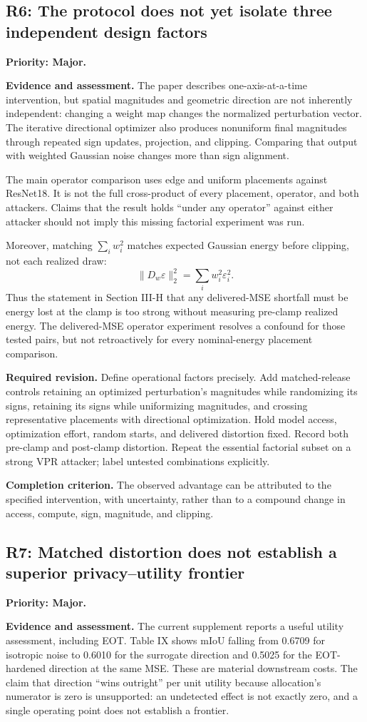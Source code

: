 \documentclass[11pt,a4paper]{article}
\newcommand{\finding}[3]{\subsection{#1: #3}\label{rev:#1}\textbf{Priority: #2.}}
\newcommand{\evidence}{\par\textbf{Evidence and assessment.} }
\newcommand{\action}{\par\textbf{Required revision.} }
\newcommand{\acceptance}{\par\textbf{Completion criterion.} }
\begin{document}
\finding{R6}{Major}{The protocol does not yet isolate three independent design factors}
\evidence
The paper describes one-axis-at-a-time intervention, but spatial magnitudes and geometric direction are not inherently independent: changing a weight map changes the normalized perturbation vector. The iterative directional optimizer also produces nonuniform final magnitudes through repeated sign updates, projection, and clipping. Comparing that output with weighted Gaussian noise changes more than sign alignment.

The main operator comparison uses edge and uniform placements against ResNet18. It is not the full cross-product of every placement, operator, and both attackers. Claims that the result holds ``under any operator'' against either attacker should not imply this missing factorial experiment was run.

Moreover, matching $\sum_iw_i^2$ matches expected Gaussian energy before clipping, not each realized draw:
\begin{equation}
\|D_w\varepsilon\|_2^2=\sum_iw_i^2\varepsilon_i^2.
\end{equation}
Thus the statement in Section III-H that any delivered-MSE shortfall must be energy lost at the clamp is too strong without measuring pre-clamp realized energy. The delivered-MSE operator experiment resolves a confound for those tested pairs, but not retroactively for every nominal-energy placement comparison.

\action
Define operational factors precisely. Add matched-release controls retaining an optimized perturbation's magnitudes while randomizing its signs, retaining its signs while uniformizing magnitudes, and crossing representative placements with directional optimization. Hold model access, optimization effort, random starts, and delivered distortion fixed. Record both pre-clamp and post-clamp distortion. Repeat the essential factorial subset on a strong VPR attacker; label untested combinations explicitly.
\acceptance
The observed advantage can be attributed to the specified intervention, with uncertainty, rather than to a compound change in access, compute, sign, magnitude, and clipping.

\finding{R7}{Major}{Matched distortion does not establish a superior privacy--utility frontier}
\evidence
The current supplement reports a useful utility assessment, including EOT. Table IX shows mIoU falling from 0.6709 for isotropic noise to 0.6010 for the surrogate direction and 0.5025 for the EOT-hardened direction at the same MSE. These are material downstream costs. The claim that direction ``wins outright'' per unit utility because allocation's numerator is zero is unsupported: an undetected effect is not exactly zero, and a single operating point does not establish a frontier.
\end{document}
